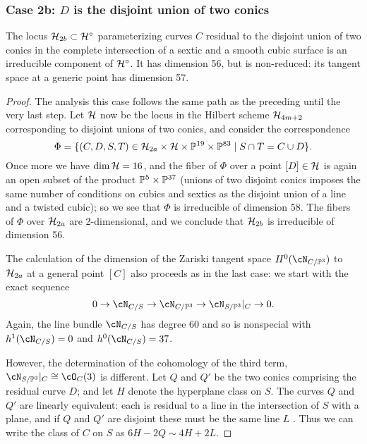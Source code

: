 \subsubsection{Case 2b: $D$ is the disjoint union of two conics}

\begin{proposition}
The locus $\cH_{2b} \subset \cH^\circ$ parameterizing curves $C$ residual to the disjoint union of two conics in the complete intersection of a sextic and a smooth cubic surface is an irreducible component of  $\cH^\circ$. It has dimension 56, but is non-reduced: its tangent space at
a generic point has dimension 57.
\end{proposition} 

\begin{proof}
The analysis this case follows the same path as the preceding until the very last step. Let $\cH$ now be the locus in the Hilbert scheme $\cH_{4m+2}$ corresponding to disjoint unions of two conics, and consider the correspondence
$$
\Phi = \{(C,D,S,T) \in \cH_{2a} \times \cH \times \PP^{19} \times \PP^{83} \mid S \cap T = C \cup D \}.
$$
Once more we have $\dim \cH = 16$, and the fiber of $\Phi$ over a point $[D] \in \cH$ is again an open subset of the product $\PP^5 \times \PP^{37}$ (unions of two disjoint conics imposes the same number of conditions on cubics and sextics as the disjoint union of a line and a twisted cubic); so we see that $\Phi$ is irreducible of dimension 58. The fibers of $\Phi$ over $ \cH_{2a}$ are 2-dimensional, and we conclude that $\cH_{2b}$ is irreducible of dimension 56.

The calculation of the dimension of the Zariski tangent space $H^0(\cN_{C/\PP^3})$ to $\cH_{2a}$ at a general point $[C]$ also proceeds as in the last case: we start with the exact sequence
$$
0 \to \cN_{C/S} \to \cN_{C/\PP^3} \to \cN_{S/\PP^3}|_C \to 0.
$$ 
Again, the line bundle $\cN_{C/S}$ has degree 60 and so is nonspecial with $h^1(\cN_{C/S}) = 0$ and $h^0(\cN_{C/S}) = 37$.

However, the determination of the cohomology of the third term, $\cN_{S/\PP^3}|_C \cong \cO_C(3)$ is different. Let $Q$ and $Q'$ be the  two conics comprising the residual curve $D$; and let $H$ denote the hyperplane class on $S$. The curves $Q$ and $Q'$ are linearly equivalent: each is residual to a line in the intersection of $S$ with a plane, and if  $Q$ and $Q'$ are disjoint these  must be the same line $L$ . Thus we can write the class of $C$ on $S$ as $6H-2Q \sim 4H+2L$.


\end{proof}
